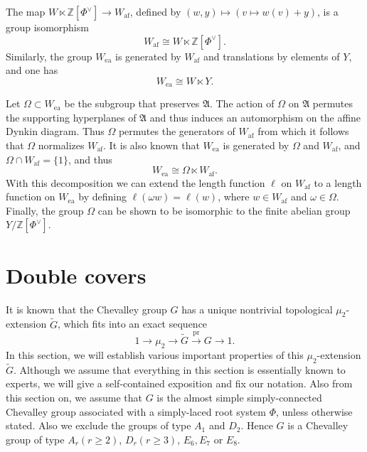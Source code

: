 \documentclass[10pt, letterpaper]{amsart}
\theoremstyle{plain}
\theoremstyle{definition}
\numberwithin{equation}{section}
\newcommand{\Z}{\mathbb{Z}}
\newcommand{\pr}{\operatorname{pr}}
\newcommand{\Gt}{\widetilde{G}}
\newcommand{\af}{\mathrm{af}}
\newcommand{\ea}{\mathrm{ea}}
\begin{document}
The map $W\ltimes \mathbb{Z}[\Phi^{\vee}]\to W_{\af}$, defined by $(w, y)\mapsto (v\mapsto w(v)+y)$, is a group isomorphism
\[
W_{\af}\cong W\ltimes \Z[\Phi^{\vee}].
\]
Similarly, the group $W_{\ea}$ is generated by $W_{\af}$ and translations by elements of $Y$, and one has
\[
W_{\ea}\cong W\ltimes Y.
\]

Let $\Omega\subset W_{\ea}$ be the subgroup that preserves $\mathfrak{A}$. The action of $\Omega$ on $\mathfrak{A}$ permutes the supporting hyperplanes of $\mathfrak{A}$ and thus induces an automorphism on the affine Dynkin diagram. Thus $\Omega$ permutes the generators of $W_{\af}$ from which it follows that $\Omega$ normalizes $W_{\af}$. It is also known that $W_{\ea}$ is generated by $\Omega$ and $W_{\af}$, and $\Omega\cap W_{\af}=\{1\}$, and thus 
\[
W_{\ea}\cong \Omega\ltimes W_{\af}.
\]
With this decomposition we can extend the length function $\ell$ on $W_{\af}$ to a length function on $W_{\ea}$ by defining $\ell(\omega w)=\ell(w)$, where $w\in W_{\af}$ and $\omega\in\Omega$. Finally, the group $\Omega$ can be shown to be isomorphic to the finite abelian group $Y/\mathbb{Z}[\Phi^{\vee}]$.



\section{Double covers}\label{S:2Cover}

It is known that the Chevalley group $G$ has a unique nontrivial topological $\mu_2$-extension $\Gt$, which fits into an exact sequence
\begin{equation}\label{CExt}
	1\longrightarrow\mu_2\longrightarrow\Gt\stackrel{\pr}{\longrightarrow} G\longrightarrow 1.
\end{equation}
In this section, we will establish various important properties of this $\mu_2$-extension $\Gt$. Although we assume that everything in this section is essentially known to experts, we will give a self-contained exposition and fix our notation. Also from this section on, we assume that $G$ is the almost simple simply-connected Chevalley group associated with a simply-laced root system $\Phi$, unless otherwise stated. Also we exclude the groups of type  $A_1$ and $D_2$. Hence $G$ is a Chevalley group of type $A_r (r\geq 2)$, $D_r (r\geq 3)$, $E_6, E_7$ or $E_8$.


\end{document}
